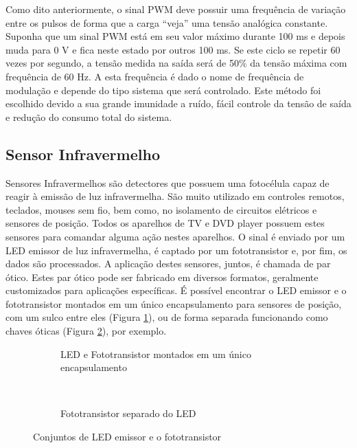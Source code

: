 Como dito anteriormente, o sinal PWM deve possuir uma frequência de variação entre os pulsos de forma que a carga “veja” uma tensão analógica constante. Suponha que um sinal PWM está em seu valor máximo durante 100 ms e depois muda para 0 V e fica neste estado por outros 100 ms. Se este ciclo se repetir 60 vezes por segundo, a tensão medida na saída será de 50\% da tensão máxima com frequência de 60 Hz. A esta frequência é dado o nome de frequência de modulação e depende do tipo sistema que será controlado.
Este método foi escolhido devido a sua grande imunidade a ruído, fácil controle da tensão de saída e redução do consumo total do sistema.

\subsection{Sensor Infravermelho} %
\label{sub:sensor_infra}

Sensores Infravermelhos são detectores que possuem uma fotocélula capaz de reagir à emissão de luz infravermelha. São muito utilizado em controles remotos, teclados, mouses sem fio, bem como, no isolamento de circuitos elétricos e sensores de posição. Todos os aparelhos de TV e DVD player possuem estes sensores para comandar alguma ação nestes aparelhos. O sinal é enviado por um LED emissor de luz infravermelha, é captado por um fototransistor e, por fim, os dados são processados. 
A aplicação destes sensores, juntos, é chamada de par ótico. Estes par ótico pode ser fabricado em diversos formatos, geralmente customizados para aplicações específicas. É possível encontrar o LED emissor e o fototransistor montados em um único encapsulamento para sensores de posição, com um sulco entre eles (Figura \ref{fig:fotoUni}), ou de forma separada funcionando como chaves óticas (Figura \ref{fig:fotoLED}), por exemplo.

\begin{figure}
        \centering
        \begin{subfigure}[b]{0.4\textwidth}
                \caption{LED e Fototransistor montados em um único encapsulamento}
                \label{fig:fotoUni}
        \end{subfigure}%
        ~
        \begin{subfigure}[b]{0.4\textwidth}
                \caption{Fototransistor separado do LED}
                \label{fig:fotoLED}
        \end{subfigure}
        \caption{Conjuntos de LED emissor e o fototransistor}
        \label{fig:LED}
\end{figure}